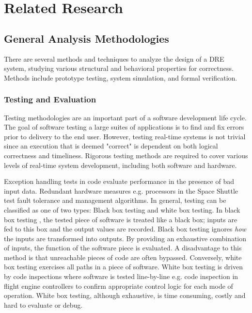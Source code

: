 \chapter{Related Research}

\section{General Analysis Methodologies}

There are several methods and techniques to analyze the design of a DRE system, studying various structural and behavioral properties for correctness. Methods include prototype testing, system simulation, and formal verification. 

\subsection{Testing and Evaluation}

Testing methodologies are an important part of a software development life cycle. The goal of software testing a large suites of applications is to find and fix errors prior to delivery to the end user. However, testing real-time systems is not trivial since an execution that is deemed "correct" is dependent on both logical correctness and timeliness. Rigorous testing methods are required to cover various levels of real-time system development, including both software and hardware. 

Exception handling \cite{goodenough1975exception} tests in code evaluate performance in the presence of bad input data. Redundant hardware measures e.g. processors in the Space Shuttle \cite{sklaroff1976redundancy} test fault tolerance and management algorithms. In general, testing can be classified as one of two types: Black box testing and white box testing. In black box testing \cite{krichen2004black}, the tested piece of software is treated like a black box; inputs are fed to this box and the output values are recorded. Black box testing ignores \emph{how} the inputs are transformed into outputs. By providing an exhaustive combination of inputs, the function of the software piece is evaluated. A disadvantage to this method is that unreachable pieces of code are often bypassed. Conversely, white box testing exercises all paths in a piece of software. White box testing is driven by code inspections where software is tested line-by-line e.g. code inspection in flight engine controllers to confirm appropriate control logic for each mode of operation. White box testing, although exhaustive, is time consuming, costly and hard to evaluate or debug. 

